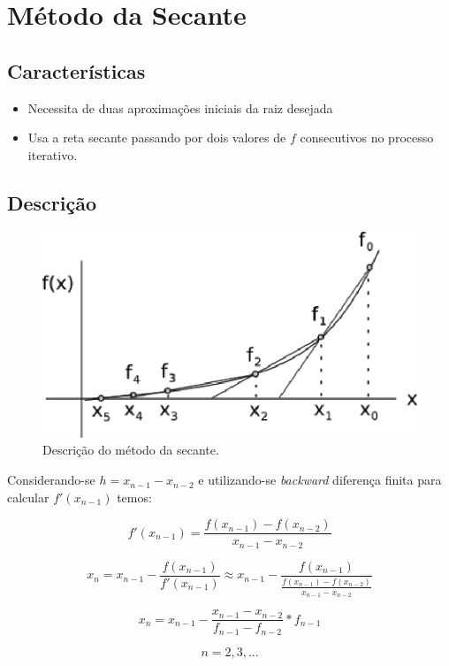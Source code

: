 \section{Método da Secante}

\subsection{Características}

\begin{itemize}
\item Necessita de duas aproximações iniciais da raiz desejada
\item Usa a reta secante passando por dois valores de $f$ consecutivos no processo iterativo.
\end{itemize}

\subsection{Descrição}

\begin{figure}[htb]
  \setlength{\abovecaptionskip}{20pt}
  \centering
  \includegraphics[scale=0.8]{capitulos/capitulo1/figuras/secante1.eps}
  \caption{Descrição do método da secante.}
  \label{fig:secante1}
\end{figure}

Considerando-se $h = x_{n-1} - x_{n-2}$ e utilizando-se \textit{backward} diferença finita para calcular $f'(x_{n-1})$ temos:

\[
 f'(x_{n-1}) = \frac{f(x_{n-1}) - f(x_{n-2})}{x_{n-1} - x_{n-2}}
\]

\[
 x_{n} = x_{n-1} - \frac{f(x_{n-1})}{f'(x_{n-1})} \approx x_{n-1} - \frac{f(x_{n-1})}{\frac{\displaystyle f(x_{n-1}) - f(x_{n-2})}{\displaystyle x_{n-1} - x_{n-2}}}
\]

\[
x_{n} = x_{n-1} - \frac{x_{n-1} - x_{n-2}}{f_{n-1} - f_{n-2}} \ast f_{n-1}
\]

\[
 n = 2, 3, ...
\]